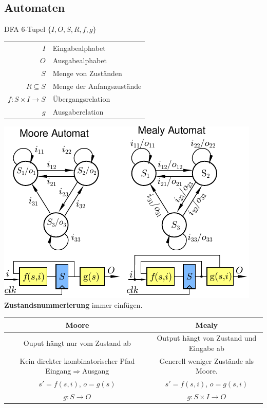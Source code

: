 \documentclass[6pt,a4paper]{scrartcl}
\renewcommand{\emph}[1]{\textsf{\textbf{#1}}}
\newcommand{\eset}[1]{\ensuremath{\bigl\{#1\bigr\}}}								%
\newcommand{\ra}[0]{\ensuremath{\rightarrow}} 									%
\begin{document}
\begin{multicols*}{3}
\section{Automaten} %

DFA 6-Tupel $\eset{I, O, S, R, f, g}$ \\

\begin{tabular}{r | l}
$I$ & Eingabealphabet \\
$O$ &  Ausgabealphabet \\
$S$ & Menge von Zuständen \\
$R \subseteq S$ &  Menge der Anfangszustände \\
$f: S \times I \ra S$  &  Übergangsrelation \\
$g$ & Ausgaberelation \\
\end{tabular}

\includegraphics{./img/ds/automaten.pdf}\\
\emph{Zustandsnummerierung} immer einfügen.\\

\begin{tabular}{c | c}
 Moore & Mealy \\ \hline
 Ouput hängt nur vom Zustand ab & Output hängt von Zustand und Eingabe ab\\
 Kein direkter kombinatorischer Pfad Eingang$\Rightarrow$Ausgang & Generell weniger Zustände als Moore.\\
 $s'=f(s,i)$, $o=g(s)$ & $s'=f(s,i)$, $o=g(s,i)$ \\
 $g: S \ra O$ & $g: S \times I \ra O$
\end{tabular}

\end{multicols*}
\end{document}
